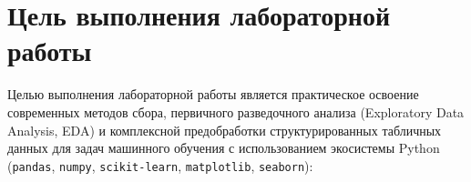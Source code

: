 \documentclass[14pt,a4paper]{extarticle}
\begin{document}
\setcounter{page}{2}

\section{Цель выполнения лабораторной работы}

Целью выполнения лабораторной работы является практическое освоение современных методов сбора, первичного разведочного анализа (Exploratory Data Analysis, EDA) и комплексной предобработки структурированных табличных данных для задач машинного обучения с использованием экосистемы Python (\texttt{pandas}, \texttt{numpy}, \texttt{scikit-learn}, \texttt{matplotlib}, \texttt{seaborn}):
\end{document}
